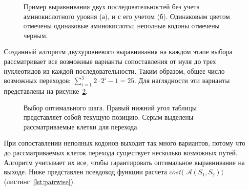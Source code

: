\begin{figure}[h]
	\begin{minipage}[h]{0.49\linewidth}
	\end{minipage}
	\hfill
	\begin{minipage}[h]{0.49\linewidth}
	\end{minipage}
	\caption{Пример выравнивания двух последовательностей без учета аминокислотного уровня (а), и с его учетом (б). Одинаковым цветом отмечены одинаковые аминокислоты; неполные кодоны отмечены черным.}
	\label{ris:NWvsMULTY}
\end{figure}

\indent Созданный алгоритм двухуровневого выравнивания на каждом этапе выбора рассматривает все возможные варианты сопоставления от нуля до трех нуклеотидов из каждой последовательности. Таким образом, общее число возможных переходов: $\sum_{i=1}^3 2\cdot 2^i-1=25$. Для наглядности эти варианты представлены на рисунке~\ref{ris:25variants}. 

\begin{figure}[H]
	\begin{minipage}[h]{0.31\linewidth}
	\end{minipage}
	\hfill
	\begin{minipage}[h]{0.31\linewidth}
	\end{minipage}
	\hfill
	\begin{minipage}[h]{0.31\linewidth}
	\end{minipage}
	\caption{Выбор оптимального шага. Правый нижний угол таблицы представляет собой текущую позицию. Серым выделены рассматриваемые клетки для перехода.}
	\label{ris:25variants}
\end{figure}

\indent При сопоставлении неполных кодонов выходит так много вариантов, потому что до рассматриваемых клеток перехода существует несколько возможных путей. Алгоритм учитывает их все, чтобы гарантировать оптимальное выравнивание на выходе. Ниже представлен псевдокод функции расчета $cost($ $\mathcal{A}(S_1, S_2))$ (листинг~\ref{lst:pairwise}).

